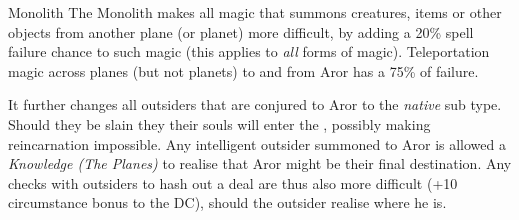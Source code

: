 \begin{35e}{Monolith}
  The Monolith makes all magic that summons creatures, items or other objects
  from another plane (or planet) more difficult, by adding a 20\% spell
  failure chance to such magic (this applies to \emph{all} forms of magic).
  Teleportation magic across planes (but not planets) to and from Aror has a
  75\% of failure.

  It further changes all outsiders that are conjured to Aror to the
  \emph{native} sub type. Should they be slain they their souls will enter the
  , possibly making reincarnation impossible. Any
  intelligent outsider summoned to Aror is allowed a \emph{Knowledge (The
    Planes)} to realise that Aror might be their final destination. Any checks
  with outsiders to hash out a deal are thus also more difficult (+10
  circumstance bonus to the DC), should the outsider realise where he is.
\end{35e}
